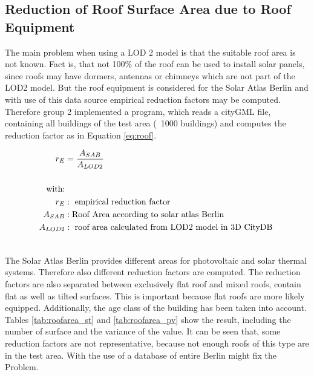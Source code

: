 \subsection{Reduction of Roof Surface Area due to Roof Equipment}
\label{sec:roofarea}
The main problem when using a LOD 2 model is that the suitable roof area is not known. Fact is, that not 100\% of the roof can be used to install solar panels, since roofs may have dormers, antennas or chimneys which are not part of the LOD2 model. But the roof equipment is considered for the Solar Atlas Berlin and with use of this data source empirical reduction factors may be computed. Therefore group 2 implemented a program, which reads a cityGML file, containing all buildings of the test area (~1000 buildings) and computes the reduction factor as in Equation \ref{eq:roof}.

\begin{align}
\label{eq:roof}
r_E &= \frac{A_{SAB}}{A_{LOD2}} \\\notag\\\notag
\text{with:}&\\\notag
r_E &:\text{ empirical reduction factor}\\\notag
A_{SAB} &: \text{Roof Area according to solar atlas Berlin }\\\notag
A_{LOD2} &: \text{ roof area calculated from LOD2 model in 3D CityDB }\\\notag
\end{align}

The Solar Atlas Berlin provides different areas for photovoltaic and solar thermal systems. Therefore also different reduction factors are computed. The reduction factors are also separated between exclusively flat roof and mixed roofs, contain flat as well as tilted surfaces. This is important because flat roofs are more likely equipped. Additionally, the age class of the building has been taken into account. Tables \ref{tab:roofarea_st} and \ref{tab:roofarea_pv} show the result, including the number of surface and the variance of the value. It can be seen that, some reduction factors are not representative, because not enough roofs of this type are in the test area. With the use of a database of entire Berlin might fix the Problem.

 

